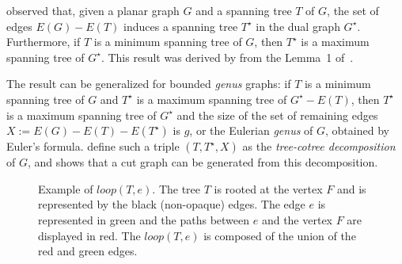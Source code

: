 \cite{Borradaile2012} observed that, given a planar graph \(G\) and a spanning tree \(T\) of \(G\), the set of edges \(E(G) - E(T)\) induces a spanning tree \(T^{\star}\) in the dual graph \(G^{\star}\). Furthermore, if \(T\) is a minimum spanning tree of \(G\), then \(T^{\star}\) is a maximum spanning tree of \(G^{\star}\). This result was derived by \citeauthor{Borradaile2012} from the Lemma~1 of~\cite{EPPSTEIN199233}.

The result can be generalized for bounded \textit{genus} graphs: if \(T\) is a minimum spanning tree of \(G\) and \(T^{\star}\) is a maximum spanning tree of \(G^{\star} - E(T)\), then \(T^{\star}\) is a maximum spanning tree of \(G^{\star}\) and the size of the set of remaining edges \(X := E(G) - E(T) - E(T^{\star})\) is \(g\), or the Eulerian \textit{genus} of \(G\), obtained by Euler's formula. \cite{Eppstein} define such a triple \((T, T^{\star}, X)\) as the \textit{tree-cotree decomposition} of \(G\), and shows that a cut graph can be generated from this decomposition.

\begin{figure}[H]
    \centering
{}
    \caption{Example of \(loop(T, e)\). The tree \(T\) is rooted at the vertex \(F\) and is represented by the black (non-opaque) edges. The edge \(e\) is represented in green and the paths between \(e\) and the vertex \(F\) are displayed in red. The \(loop(T, e)\) is composed of the union of the red and green edges.}
    \label{fig:loop_T_e}
\end{figure}


